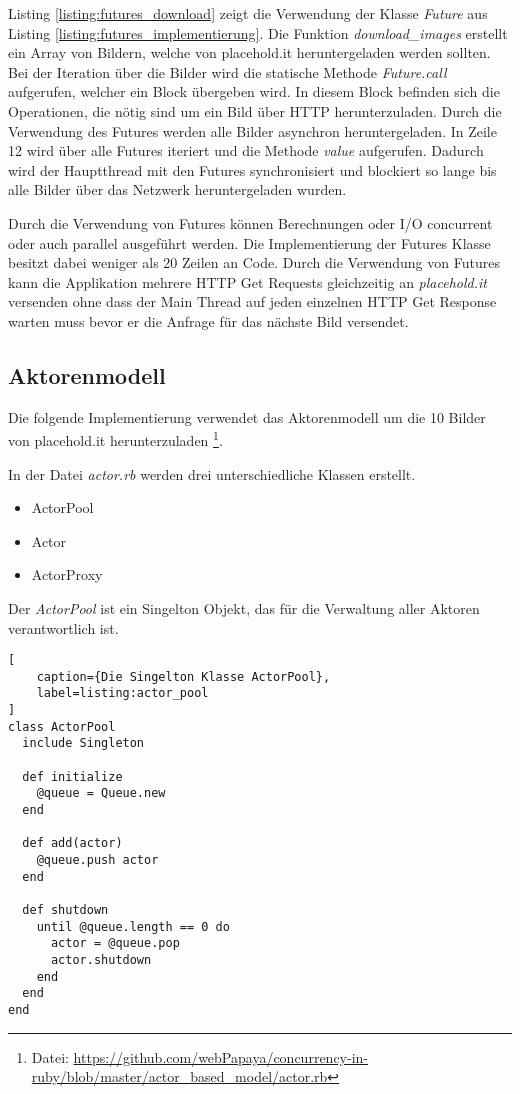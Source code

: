 Listing \ref{listing:futures_download} zeigt die Verwendung der Klasse \emph{Future} aus Listing \ref{listing:futures_implementierung}. Die Funktion \emph{download\_images} erstellt ein Array von Bildern, welche von placehold.it heruntergeladen werden sollten. Bei der Iteration über die Bilder wird die statische Methode \emph{Future.call} aufgerufen, welcher ein Block übergeben wird. In diesem Block befinden sich die Operationen, die nötig sind um ein Bild über HTTP herunterzuladen. Durch die Verwendung des Futures werden alle Bilder asynchron heruntergeladen. In Zeile 12 wird über alle Futures iteriert und die Methode \emph{value} aufgerufen. Dadurch wird der Hauptthread mit den Futures synchronisiert und blockiert so lange bis alle Bilder über das Netzwerk heruntergeladen wurden. 

Durch die Verwendung von Futures können Berechnungen oder I/O concurrent oder auch parallel ausgeführt werden. Die Implementierung der Futures Klasse besitzt dabei weniger als 20 Zeilen an Code. Durch die Verwendung von Futures kann die Applikation mehrere HTTP Get Requests gleichzeitig an \emph{placehold.it} versenden ohne dass der Main Thread auf jeden einzelnen HTTP Get Response warten muss bevor er die Anfrage für das nächste Bild versendet. 

\subsection{Aktorenmodell}

Die folgende Implementierung verwendet das Aktorenmodell um die 10 Bilder von placehold.it herunterzuladen \footnote{Datei: \url{https://github.com/webPapaya/concurrency-in-ruby/blob/master/actor_based_model/actor.rb}}.

In der Datei \emph{actor.rb} werden drei unterschiedliche Klassen erstellt.

\begin{itemize}
  \item ActorPool
  \item Actor
  \item ActorProxy
\end{itemize}

Der \emph{ActorPool} ist ein Singelton Objekt, das für die Verwaltung aller Aktoren verantwortlich ist. 

\begin{lstlisting}[
	caption={Die Singelton Klasse ActorPool},
	label=listing:actor_pool
]
class ActorPool
  include Singleton

  def initialize
    @queue = Queue.new
  end

  def add(actor)
    @queue.push actor
  end

  def shutdown
    until @queue.length == 0 do
      actor = @queue.pop
      actor.shutdown
    end
  end
end
\end{lstlisting}


